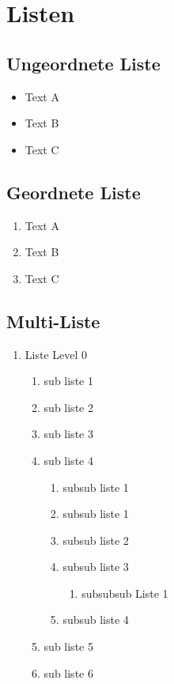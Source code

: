 \documentclass{scrreprt}
\begin{document}
	\chapter{Listen}
	\label{cha:listen}
	
		\section{Ungeordnete Liste}
		\label{se:ungerodneteli}
			\begin{itemize}
				\item Text A
				\item Text B
				\item Text C
		\end{itemize}
	
		\section{Geordnete Liste}
		\label{se:geordneteli}

			\begin{enumerate}
				\item Text A
				\item Text B
				\item Text C
			\end{enumerate}


		\section{Multi-Liste}
		\label{se:multili}
	
			\begin{enumerate}    
				\item Liste Level 0
		
					\begin{enumerate}
						\item sub liste 1
						\item sub liste 2
						\item sub liste 3
						\item sub liste 4
			
					\begin{enumerate}
						\item subsub liste 1
						\item subsub liste 1
			 			\item subsub liste 2
			 			\item subsub liste 3
			 			\begin{enumerate}
							\item  subsubsub Liste 1	 			
		 				\end{enumerate}
			 			\item subsub liste 4				
					\end{enumerate}
						\item sub liste 5
						\item sub liste 6
			
					\end{enumerate}
		
			\end{enumerate}
\end{document}
